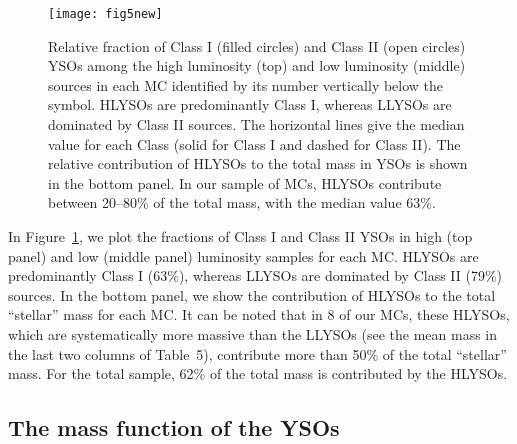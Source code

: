 \documentclass[iop]{emulateapj}
\newcommand{\mipslam}{24~$\mu$m}
\begin{document}
\begin{figure}[ht!]
     \begin{center}
            \texttt{[image: fig5new]}
    \end{center}
\caption{
Relative fraction of Class I (filled circles) and Class II (open circles) YSOs 
among the high luminosity (top) and low luminosity (middle) sources in
each MC identified by its number vertically below the symbol.
HLYSOs are predominantly Class I, whereas LLYSOs are dominated by Class II sources. 
The horizontal lines give the median value for each Class (solid for Class I and 
dashed for Class II). 
The relative contribution of HLYSOs to the total mass in YSOs is shown in 
the bottom panel. In our sample of MCs, HLYSOs contribute between 20--80\%
of the total mass, with the median value 63\%.
}
\label{figure5}
\end{figure}

In Figure~\ref{figure5}, we plot the fractions of Class I and Class II YSOs in
high (top panel) and low (middle panel) luminosity samples for each MC. 
HLYSOs are predominantly Class I (63\%), whereas LLYSOs are dominated by Class II 
(79\%) sources. In the bottom panel, we show the contribution of HLYSOs to the
total ``stellar'' mass for each MC. It can be noted that in 8 of our MCs,
these HLYSOs, which are systematically more massive than the LLYSOs (see the
mean mass in the last two columns of Table~5),
contribute more than 50\% of the total ``stellar'' mass. 
For the total sample, 62\% of the total mass is contributed by the HLYSOs.


\subsection{The mass function of the YSOs}
\end{document}

